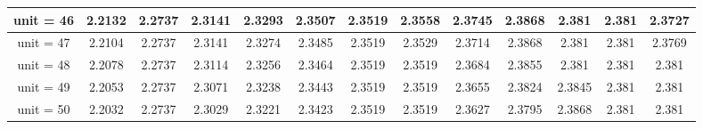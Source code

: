 \begin{table*}[ht]
\begin{tabular}{|c|c|c|c|c|c|c|c|c|c|c|c|c|}
\hline
unit = 46 &
2.2132 & 2.2737 & 2.3141 & 2.3293 & 2.3507 & 2.3519 & 2.3558 & 2.3745 & 2.3868 & 2.381 & 2.381 & 2.3727 \\
\hline
unit = 47 &
2.2104 & 2.2737 & 2.3141 & 2.3274 & 2.3485 & 2.3519 & 2.3529 & 2.3714 & 2.3868 & 2.381 & 2.381 & 2.3769 \\
\hline
unit = 48 &
2.2078 & 2.2737 & 2.3114 & 2.3256 & 2.3464 & 2.3519 & 2.3519 & 2.3684 & 2.3855 & 2.381 & 2.381 & 2.381 \\
\hline
unit = 49 &
2.2053 & 2.2737 & 2.3071 & 2.3238 & 2.3443 & 2.3519 & 2.3519 & 2.3655 & 2.3824 & 2.3845 & 2.381 & 2.381 \\
\hline
unit = 50 &
2.2032 & 2.2737 & 2.3029 & 2.3221 & 2.3423 & 2.3519 & 2.3519 & 2.3627 & 2.3795 & 2.3868 & 2.381 & 2.381 \\
\hline
\end{tabular}
\normalsize
\end{table*}
